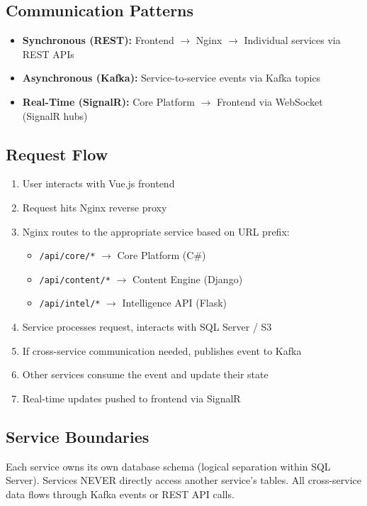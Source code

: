 \documentclass[12pt,letterpaper]{article}
\begin{document}
\subsection{Communication Patterns}
\begin{itemize}
  \item \textbf{Synchronous (REST):} Frontend $\rightarrow$ Nginx $\rightarrow$ Individual services via REST APIs
  \item \textbf{Asynchronous (Kafka):} Service-to-service events via Kafka topics
  \item \textbf{Real-Time (SignalR):} Core Platform $\rightarrow$ Frontend via WebSocket (SignalR hubs)
\end{itemize}

\subsection{Request Flow}
\begin{enumerate}
  \item User interacts with Vue.js frontend
  \item Request hits Nginx reverse proxy
  \item Nginx routes to the appropriate service based on URL prefix:
    \begin{itemize}
      \item \texttt{/api/core/*} $\rightarrow$ Core Platform (C\#)
      \item \texttt{/api/content/*} $\rightarrow$ Content Engine (Django)
      \item \texttt{/api/intel/*} $\rightarrow$ Intelligence API (Flask)
    \end{itemize}
  \item Service processes request, interacts with SQL Server / S3
  \item If cross-service communication needed, publishes event to Kafka
  \item Other services consume the event and update their state
  \item Real-time updates pushed to frontend via SignalR
\end{enumerate}

\subsection{Service Boundaries}
Each service owns its own database schema (logical separation within SQL Server). Services NEVER directly access another service's tables. All cross-service data flows through Kafka events or REST API calls.
\end{document}
